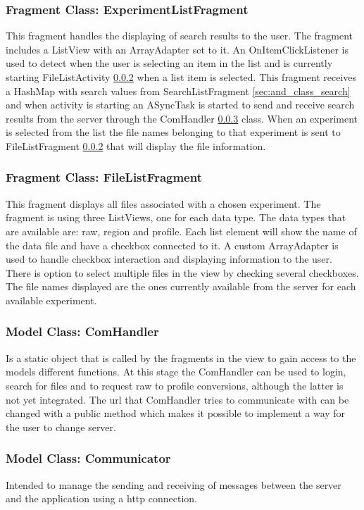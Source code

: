 \subsubsection{Fragment Class: ExperimentListFragment}
This fragment handles the displaying of search results to the user. The fragment includes a ListView with an ArrayAdapter set to it. An OnItemClickListener is used to detect when the user is selecting an item in the list and is currently starting FileListActivity \ref{sec:and_class_filelist} when a list item is selected. This fragment receives a HashMap with search values from SearchListFragment \ref{sec:and_class_search} and when activity is starting an ASyncTask is started to send and receive search results from the server through the ComHandler \ref{sec:and_class_comhandler} class. When an experiment is selected from the list the file names belonging to that experiment is sent to FileListFragment \ref{sec:and_class_filelist} that will display the file information. 
\subsubsection{Fragment Class: FileListFragment}\label{sec:and_class_filelist}
This fragment displays all files associated with a chosen experiment. The fragment is using three ListViews, one for each data type. The data types that are available are: raw, region and profile. Each list element will show the name of the data file and have a checkbox connected to it. A custom ArrayAdapter is used to handle checkbox interaction and displaying information to the user. There is option to select multiple files in the view by checking several checkboxes. The file names displayed are the ones currently available from the server for each available experiment.
\subsubsection{Model Class: ComHandler}\label{sec:and_class_comhandler}
Is a static object that is called by the fragments in the view to gain access to the models different functions. At this stage the ComHandler can be used to login, search for files and to request raw to profile conversions, although the latter is not yet integrated. The url that ComHandler tries to communicate with can be changed with a public method which makes it possible to implement a way for the user to change server.
\subsubsection{Model Class: Communicator}
Intended to manage the sending and receiving of messages between the server and the application using a http connection.
